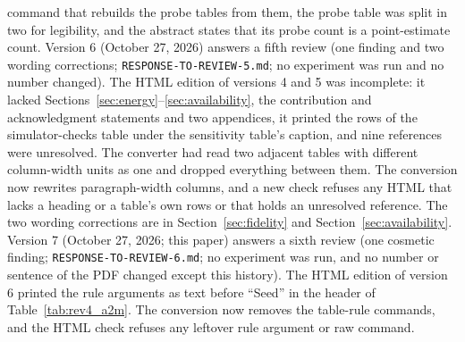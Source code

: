 command that rebuilds the probe tables from them, the probe table was split in two for legibility, and the abstract
states that its probe count is a point-estimate count. Version 6 (October 27, 2026) answers a fifth review
(one finding and two wording corrections; \texttt{RESPONSE-TO-REVIEW-5.md}; no experiment was run and no number
changed). The HTML edition of versions 4 and 5 was incomplete: it lacked Sections~\ref{sec:energy}--\ref{sec:availability}, the
contribution and acknowledgment statements and two appendices, it printed the rows of the simulator-checks table under the
sensitivity table's caption, and nine references were unresolved. The converter had read two adjacent tables with
different column-width units as one and dropped everything between them. The conversion now rewrites paragraph-width
columns, and a new check refuses any HTML that lacks a heading or a table's own rows or that holds an unresolved reference. The
two wording corrections are in Section~\ref{sec:fidelity} and Section~\ref{sec:availability}. Version 7 (October 27, 2026;
this paper) answers a sixth review (one cosmetic finding; \texttt{RESPONSE-TO-REVIEW-6.md}; no experiment was run, and no
number or sentence of the PDF changed except this history). The HTML edition of version 6 printed the rule arguments
as text before ``Seed'' in the header of Table~\ref{tab:rev4_a2m}. The conversion now removes the table-rule
commands, and the HTML check refuses any leftover rule argument or raw command.

